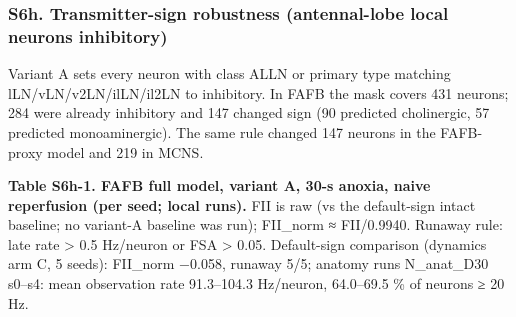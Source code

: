 \documentclass[11pt]{article}
\begin{document}
\subsubsection{S6h. Transmitter-sign robustness (antennal-lobe local neurons inhibitory)}\label{s6h.-transmitter-sign-robustness-antennal-lobe-local-neurons-inhibitory}

Variant A sets every neuron with class ALLN or primary type matching lLN/vLN/v2LN/ilLN/il2LN to inhibitory. In FAFB the mask covers 431 neurons; 284 were already inhibitory and 147 changed sign (90 predicted cholinergic, 57 predicted monoaminergic). The same rule changed 147 neurons in the FAFB-proxy model and 219 in MCNS.

\textbf{Table S6h-1. FAFB full model, variant A, 30-s anoxia, naive reperfusion (per seed; local runs).} FII is raw (vs the default-sign intact baseline; no variant-A baseline was run); FII\_norm ≈ FII/0.9940. Runaway rule: late rate \textgreater{} 0.5 Hz/neuron or FSA \textgreater{} 0.05. Default-sign comparison (dynamics arm C, 5 seeds): FII\_norm −0.058, runaway 5/5; anatomy runs N\_anat\_D30 s0--s4: mean observation rate 91.3--104.3 Hz/neuron, 64.0--69.5 \% of neurons ≥ 20 Hz.
\end{document}
